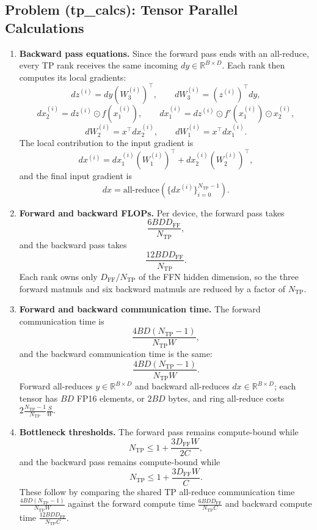 \documentclass[11pt]{article}
\begin{document}
\subsection{Problem (tp\_calcs): Tensor Parallel Calculations}

\begin{enumerate}
  \item \textbf{Backward pass equations.}
  Since the forward pass ends with an all-reduce, every TP rank receives the same incoming $dy \in \mathbb{R}^{B \times D}$. Each rank then computes its local gradients:
  \[
    dz^{(i)} = dy (W_3^{(i)})^\top,
    \qquad
    dW_3^{(i)} = (z^{(i)})^\top dy,
  \]
  \[
    dx_2^{(i)} = dz^{(i)} \odot f(x_1^{(i)}),
    \qquad
    dx_1^{(i)} = dz^{(i)} \odot f'(x_1^{(i)}) \odot x_2^{(i)},
  \]
  \[
    dW_2^{(i)} = x^\top dx_2^{(i)},
    \qquad
    dW_1^{(i)} = x^\top dx_1^{(i)}.
  \]
  The local contribution to the input gradient is
  \[
    dx^{(i)} = dx_1^{(i)}(W_1^{(i)})^\top + dx_2^{(i)}(W_2^{(i)})^\top,
  \]
  and the final input gradient is
  \[
    dx = \mathrm{all\text{-}reduce}\left(\{dx^{(i)}\}_{i=0}^{N_{\mathrm{TP}}-1}\right).
  \]

  \item \textbf{Forward and backward FLOPs.}
  Per device, the forward pass takes
  \[
    \frac{6BD D_{\mathrm{FF}}}{N_{\mathrm{TP}}},
  \]
  and the backward pass takes
  \[
    \frac{12BD D_{\mathrm{FF}}}{N_{\mathrm{TP}}}.
  \]
  Each rank owns only $D_{\mathrm{FF}}/N_{\mathrm{TP}}$ of the FFN hidden dimension, so the three forward matmuls and six backward matmuls are reduced by a factor of $N_{\mathrm{TP}}$.

  \item \textbf{Forward and backward communication time.}
  The forward communication time is
  \[
    \frac{4BD(N_{\mathrm{TP}}-1)}{N_{\mathrm{TP}}W},
  \]
  and the backward communication time is the same:
  \[
    \frac{4BD(N_{\mathrm{TP}}-1)}{N_{\mathrm{TP}}W}.
  \]
  Forward all-reduces $y \in \mathbb{R}^{B \times D}$ and backward all-reduces $dx \in \mathbb{R}^{B \times D}$; each tensor has $BD$ FP16 elements, or $2BD$ bytes, and ring all-reduce costs $2\frac{N_{\mathrm{TP}}-1}{N_{\mathrm{TP}}}\frac{S}{W}$.

  \item \textbf{Bottleneck thresholds.}
  The forward pass remains compute-bound while
  \[
    N_{\mathrm{TP}} \le 1 + \frac{3D_{\mathrm{FF}}W}{2C},
  \]
  and the backward pass remains compute-bound while
  \[
    N_{\mathrm{TP}} \le 1 + \frac{3D_{\mathrm{FF}}W}{C}.
  \]
  These follow by comparing the shared TP all-reduce communication time $\frac{4BD(N_{\mathrm{TP}}-1)}{N_{\mathrm{TP}}W}$ against the forward compute time $\frac{6BD D_{\mathrm{FF}}}{N_{\mathrm{TP}}C}$ and backward compute time $\frac{12BD D_{\mathrm{FF}}}{N_{\mathrm{TP}}C}$.
\end{enumerate}
\end{document}
